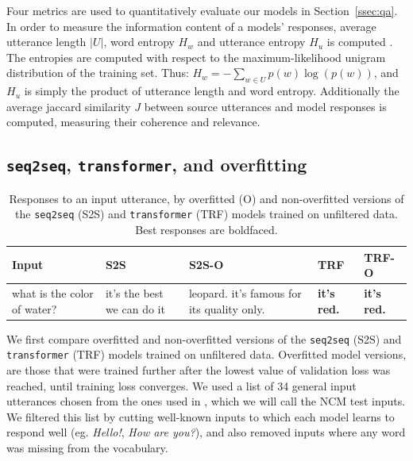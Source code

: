 \documentclass[11pt,a4paper]{article}
\begin{document}
Four metrics are used to quantitatively evaluate our models in Section~\ref{ssec:qa}. In order to measure the information content of a models' responses, average utterance length \(|U|\), word entropy \(H_w\) and utterance entropy \(H_u\) is computed \cite{Serban:2017b}. The entropies are computed with respect to the maximum-likelihood unigram distribution of the training set. Thus: \(H_w=-\sum_{w\in{U}} p(w)\log(p(w))\), and \(H_u\) is simply the product of utterance length and word entropy. Additionally the average jaccard similarity \(J\) between source utterances and model responses is computed, measuring their coherence and relevance.  


\subsection{\texttt{seq2seq}, \texttt{transformer}, and overfitting}
\label{ssec:model_overfitting}

\begin{table}[t!]
	\small
	\begin{center}
		\begin{tabular}{p{1.2cm}p{1.1cm}p{1.8cm}p{0.4cm}p{1cm}}
			\textbf{Input} & \textbf{S2S} & \textbf{S2S-O} & \textbf{TRF} & \textbf{TRF-O} \\ \hline
			what is the color of water? & it's the best we can do it & leopard. it's famous for its quality only. & \textbf{it's red.} & \textbf{it's red.} \\ \hline 

			
		\end{tabular}
	\end{center}
	\caption{\label{table:ncm_test} Responses to an input utterance, by overfitted (O) and non-overfitted versions of the \texttt{seq2seq} (S2S) and \texttt{transformer} (TRF) models trained on unfiltered data. Best responses are boldfaced.}
\end{table}

We first compare overfitted and non-overfitted versions of the \texttt{seq2seq} (S2S) and
\texttt{transformer} (TRF) models trained on unfiltered data. Overfitted model versions,
are those that were trained further after the lowest value of validation loss
was reached, until training loss converges. We used a list of 34 general input utterances chosen from the ones used in \citet{Vinyals:2015d}, which we will call the NCM test inputs. We filtered this list by cutting well-known inputs to which each model learns to respond well (eg. \textit{Hello!}, \textit{How are you?}), and also removed inputs where any word was missing from the vocabulary.
\end{document}
